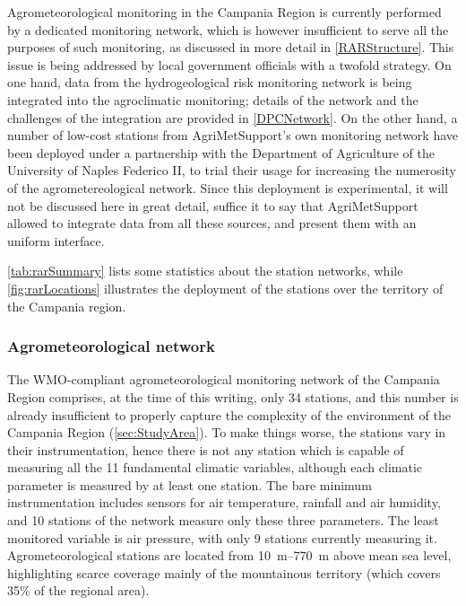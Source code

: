 \documentclass[authoryear,preprint,review,12pt]{elsarticle}
\begin{document}
Agrometeorological monitoring in the Campania Region is currently performed by a dedicated monitoring network, which is however insufficient to serve all the purposes of such monitoring, as discussed in more detail in \cref{RARStructure}.
This issue is being addressed by local government officials with a twofold strategy.
On one hand, data from the hydrogeological risk monitoring network is being integrated into the agroclimatic monitoring; details of the network and the challenges of the integration are provided in \cref{DPCNetwork}.
On the other hand, a number of low-cost stations from AgriMetSupport's own monitoring network have been deployed under a partnership with the Department of Agriculture of the University of Naples Federico II, to trial their usage for increasing the numerosity of the agrometereological network.
Since this deployment is experimental, it will not be discussed here in great detail, suffice it to say that AgriMetSupport allowed to integrate data from all these sources, and present them with an uniform interface.

\cref{tab:rarSummary} lists some statistics about the station networks, while \cref{fig:rarLocations} illustrates the deployment of the stations over the territory of the Campania region.

\subsubsection{Agrometeorological network\label{RARStructure}}

The WMO-compliant agrometeorological monitoring network of the Campania Region comprises, at the time of this writing, only 34 stations, and this number is already insufficient to properly capture the complexity of the environment of the Campania Region (\cref{sec:StudyArea}).
To make things worse, the stations vary in their instrumentation, hence there is not any station which is capable of measuring all the 11 fundamental climatic variables, although each climatic parameter is measured by at least one station.
The bare minimum instrumentation includes sensors for air temperature, rainfall and air humidity, and 10 stations of the network measure only these three parameters.
The least monitored variable is air pressure, with only 9 stations currently measuring it.
Agrometeorological stations are located from \SIrange{10}{770}{\metre} above mean sea level, highlighting scarce coverage mainly of the mountainous territory (which covers 35\% of the regional area).
\end{document}
